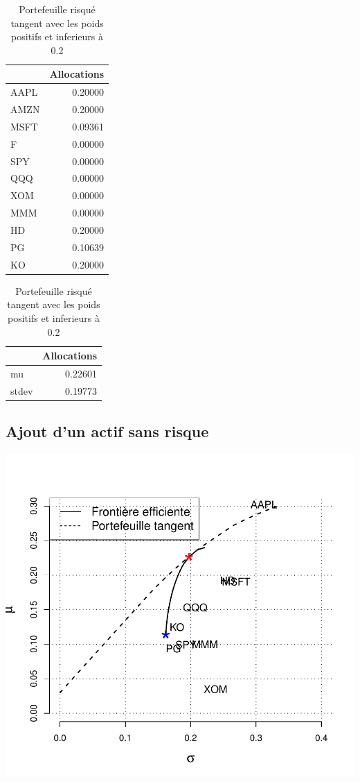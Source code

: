 \documentclass[
]{article}
\begin{document}
\begin{table}
\caption{\label{tab:unnamed-chunk-16}Portefeuille risqué tangent avec les poids positifs et inferieurs à 0.2}

\centering
\begin{tabular}[t]{lr}
\toprule
  & Allocations\\
\midrule
AAPL & 0.20000\\
AMZN & 0.20000\\
MSFT & 0.09361\\
F & 0.00000\\
SPY & 0.00000\\
\addlinespace
QQQ & 0.00000\\
XOM & 0.00000\\
MMM & 0.00000\\
HD & 0.20000\\
PG & 0.10639\\
\addlinespace
KO & 0.20000\\
\bottomrule
\end{tabular}
\centering
\begin{tabular}[t]{lr}
\toprule
  & Allocations\\
\midrule
mu & 0.22601\\
stdev & 0.19773\\
\bottomrule
\end{tabular}
\end{table}

\hypertarget{ajout-dun-actif-sans-risque-1}{%
\subsection{Ajout d'un actif sans
risque}\label{ajout-dun-actif-sans-risque-1}}

\includegraphics{TP-2_files/figure-latex/unnamed-chunk-17-1.pdf}
\end{document}
